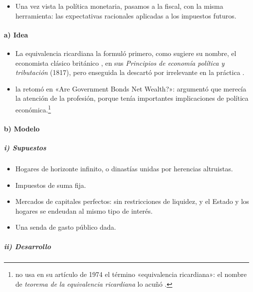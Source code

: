 \documentclass[11pt]{article}
\begin{document}
\begin{itemize}
\item Una vez vista la política monetaria, pasamos a la fiscal, con la misma herramienta: las expectativas racionales aplicadas a los impuestos futuros.
\end{itemize}

\paragraph{a) Idea}

\begin{itemize}
\item La equivalencia ricardiana la formuló primero, como sugiere su nombre, el economista clásico británico , en sus \emph{Principios de economía política y tributación} (1817), pero enseguida la descartó por irrelevante en la práctica .
\item {} la retomó en «Are Government Bonds Net Wealth?»\nocite{Barro1974}: argumentó que merecía la atención de la profesión, porque tenía importantes implicaciones de política económica.\footnote{ no usa en su artículo de 1974 el término «equivalencia ricardiana»: el nombre de \emph{teorema de la equivalencia ricardiana} lo acuñó \textcite{Buchanan1976Barro}.}
\end{itemize}

\paragraph{b) Modelo}

\subparagraph{i) Supuestos}

\begin{itemize}
\item Hogares de horizonte infinito, o dinastías unidas por herencias altruistas.
\item Impuestos de suma fija.
\item Mercados de capitales perfectos: sin restricciones de liquidez, y el Estado y los hogares se endeudan al mismo tipo de interés.
\item Una senda de gasto público dada.
\end{itemize}

\subparagraph{ii) Desarrollo}
\end{document}
